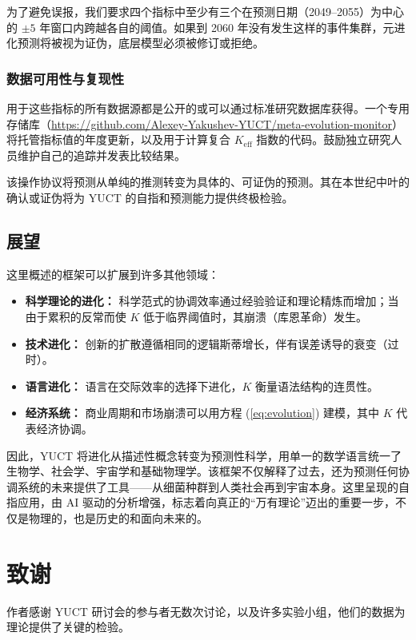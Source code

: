 \documentclass[12pt,a4paper]{article}
\theoremstyle{remark}
\begin{document}
		为了避免误报，我们要求四个指标中至少有三个在预测日期（2049–2055）为中心的 $\pm 5$ 年窗口内跨越各自的阈值。如果到 2060 年没有发生这样的事件集群，元进化预测将被视为证伪，底层模型必须被修订或拒绝。
		
		\subsubsection{数据可用性与复现性}
		
		用于这些指标的所有数据源都是公开的或可以通过标准研究数据库获得。一个专用存储库（\url{https://github.com/Alexey-Yakushev-YUCT/meta-evolution-monitor}）将托管指标值的年度更新，以及用于计算复合 $K_{\text{eff}}$ 指数的代码。鼓励独立研究人员维护自己的追踪并发表比较结果。
		
		该操作协议将预测从单纯的推测转变为具体的、可证伪的预测。其在本世纪中叶的确认或证伪将为 YUCT 的自指和预测能力提供终极检验。
		
		\subsection*{展望}
		
		这里概述的框架可以扩展到许多其他领域：
		\begin{itemize}
			\item \textbf{科学理论的进化：} 科学范式的协调效率通过经验验证和理论精炼而增加；当由于累积的反常而使 $K$ 低于临界阈值时，其崩溃（库恩革命）发生。
			\item \textbf{技术进化：} 创新的扩散遵循相同的逻辑斯蒂增长，伴有误差诱导的衰变（过时）。
			\item \textbf{语言进化：} 语言在交际效率的选择下进化，$K$ 衡量语法结构的连贯性。
			\item \textbf{经济系统：} 商业周期和市场崩溃可以用方程 (\ref{eq:evolution}) 建模，其中 $K$ 代表经济协调。
		\end{itemize}
		
		因此，YUCT 将进化从描述性概念转变为预测性科学，用单一的数学语言统一了生物学、社会学、宇宙学和基础物理学。该框架不仅解释了过去，还为预测任何协调系统的未来提供了工具——从细菌种群到人类社会再到宇宙本身。这里呈现的自指应用，由 AI 驱动的分析增强，标志着向真正的“万有理论”迈出的重要一步，不仅是物理的，也是历史的和面向未来的。
		
		\section*{致谢}
		
		作者感谢 YUCT 研讨会的参与者无数次讨论，以及许多实验小组，他们的数据为理论提供了关键的检验。
		
\end{document}
